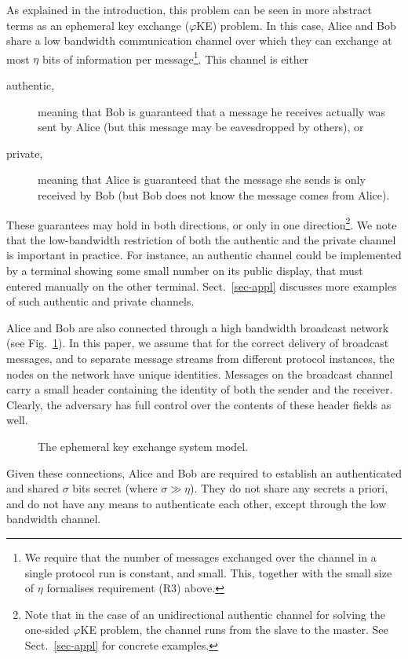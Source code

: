 \documentclass[runningheads,envcountsame,envcountsect,oribibl]{llncs}
\newcommand{\eke}{$\varphi$KE}
\renewcommand{\cap}{\eta}
\newcommand{\sks}{\sigma}
\begin{document}
As explained in the introduction, this problem can be seen in more abstract
terms as an ephemeral key exchange (\eke) problem. In this case, 
Alice and Bob share a low bandwidth communication channel over which they 
can exchange at most $\cap$ bits of information per message\footnote{
  We require that the number of messages exchanged over the channel in a single
  protocol run is constant, and small. This, together with the small size
  of $\cap$ formalises requirement (R3) above.
}. 
This channel is either
\begin{description}
\item[authentic,] meaning that Bob is guaranteed that a message he receives
  actually was sent by Alice (but this message may be eavesdropped by others),
  or 
\item[private,] meaning that Alice is guaranteed that the message she sends
  is only received by Bob (but Bob does not know the message comes from Alice).
\end{description}
These guarantees may hold in both directions, or only in one
direction\footnote{ 
  Note that in the case of an unidirectional authentic channel for solving the 
  one-sided \eke{} problem, the channel runs from the slave to the master. See
  Sect.~\ref{sec-appl} for concrete examples.
}.
We note that the low-bandwidth restriction of both the authentic and the
private channel is important in practice. For instance, an authentic channel
could be implemented by a terminal showing some small number on its public
display, that must entered manually on the other terminal.
Sect.~\ref{sec-appl} discusses more examples of such authentic and private
channels.


Alice and Bob are also connected through a high bandwidth broadcast
network (see Fig.~\ref{fig-exchange}). In this paper, we assume that for the 
correct delivery of broadcast messages, and to separate message streams from
different protocol instances, the nodes on the network have unique identities.
Messages on the broadcast channel carry a small header containing the identity
of both the sender and the receiver. Clearly, the adversary has full control
over the contents of these header fields as well.
\psfrag{ac}{$\cap$ bits communication channel}
\begin{figure}[t]
\begin{center}
\end{center}
\caption{The ephemeral key exchange system model.}
\label{fig-exchange}
\end{figure}
Given these connections, Alice and Bob are required to establish an
authenticated and shared $\sks$ bits secret (where $\sks \gg \cap$). They do
not share any secrets a priori, and do not have any means to authenticate each
other, except through the low bandwidth channel.
\end{document}
